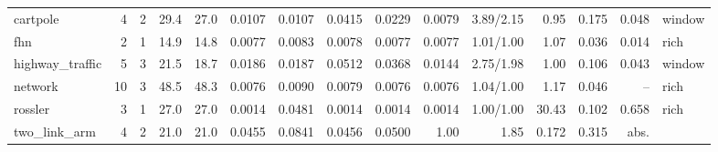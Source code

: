 \begin{table}[ht]
\begin{tabular}{@{}lrrrrrrrrrrrrrl@{}}
cartpole & 4 & 2 & 29.4 & 27.0 & 0.0107 & 0.0107 & 0.0415 & 0.0229 & 0.0079 & 3.89/2.15 & 0.95 & 0.175 & 0.048 & window \\
fhn & 2 & 1 & 14.9 & 14.8 & 0.0077 & 0.0083 & 0.0078 & 0.0077 & 0.0077 & 1.01/1.00 & 1.07 & 0.036 & 0.014 & rich \\
highway\_traffic & 5 & 3 & 21.5 & 18.7 & 0.0186 & 0.0187 & 0.0512 & 0.0368 & 0.0144 & 2.75/1.98 & 1.00 & 0.106 & 0.043 & window \\
network & 10 & 3 & 48.5 & 48.3 & 0.0076 & 0.0090 & 0.0079 & 0.0076 & 0.0076 & 1.04/1.00 & 1.17 & 0.046 & -- & rich \\
rossler & 3 & 1 & 27.0 & 27.0 & 0.0014 & 0.0481 & 0.0014 & 0.0014 & 0.0014 & 1.00/1.00 & 30.43 & 0.102 & 0.658 & rich \\
two\_link\_arm & 4 & 2 & 21.0 & 21.0 & 0.0455 & 0.0841 & 0.0456 & 0.0500 & 1.00 & 1.85 & 0.172 & 0.315 & abs. \\\hline
\end{tabular}
\end{table}

